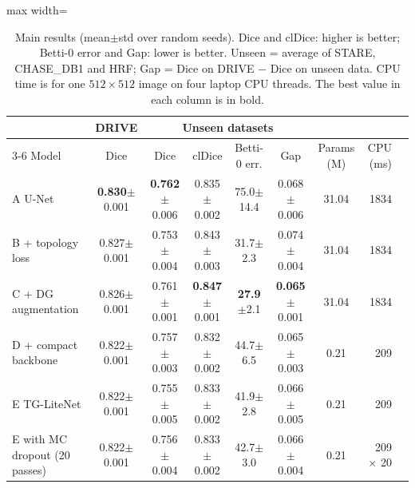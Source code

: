 \begin{table}[t]
\centering
\caption{Main results (mean$\pm$std over random seeds). Dice and clDice: higher is better; Betti-0 error and Gap: lower is better. Unseen = average of STARE, CHASE\_DB1 and HRF; Gap = Dice on DRIVE $-$ Dice on unseen data. CPU time is for one $512{\times}512$ image on four laptop CPU threads. The best value in each column is in bold.}
\label{tab:main}
\small
\begin{adjustbox}{max width=\textwidth}\begin{tabular}{l c cccc c rr}
\toprule
 & DRIVE & \multicolumn{4}{c}{Unseen datasets} & & & \\
\cmidrule(lr){3-6}
Model & Dice & Dice & clDice & Betti-0 err. & Gap & Params (M) & CPU (ms) \\
\midrule
A  U-Net & \textbf{0.830}{\scriptsize$\pm$0.001} & \textbf{0.762}{\scriptsize$\pm$0.006} & 0.835{\scriptsize$\pm$0.002} & 75.0{\scriptsize$\pm$14.4} & 0.068{\scriptsize$\pm$0.006} & 31.04 & 1834 \\
B  + topology loss & 0.827{\scriptsize$\pm$0.001} & 0.753{\scriptsize$\pm$0.004} & 0.843{\scriptsize$\pm$0.003} & 31.7{\scriptsize$\pm$2.3} & 0.074{\scriptsize$\pm$0.004} & 31.04 & 1834 \\
C  + DG augmentation & 0.826{\scriptsize$\pm$0.001} & 0.761{\scriptsize$\pm$0.001} & \textbf{0.847}{\scriptsize$\pm$0.001} & \textbf{27.9}{\scriptsize$\pm$2.1} & \textbf{0.065}{\scriptsize$\pm$0.001} & 31.04 & 1834 \\
D  + compact backbone & 0.822{\scriptsize$\pm$0.001} & 0.757{\scriptsize$\pm$0.003} & 0.832{\scriptsize$\pm$0.002} & 44.7{\scriptsize$\pm$6.5} & 0.065{\scriptsize$\pm$0.003} & 0.21 & 209 \\
E  TG-LiteNet & 0.822{\scriptsize$\pm$0.001} & 0.755{\scriptsize$\pm$0.005} & 0.833{\scriptsize$\pm$0.002} & 41.9{\scriptsize$\pm$2.8} & 0.066{\scriptsize$\pm$0.005} & 0.21 & 209 \\
E  with MC dropout (20 passes) & 0.822{\scriptsize$\pm$0.001} & 0.756{\scriptsize$\pm$0.004} & 0.833{\scriptsize$\pm$0.002} & 42.7{\scriptsize$\pm$3.0} & 0.066{\scriptsize$\pm$0.004} & 0.21 & 209 $\times$ 20 \\
\bottomrule
\end{tabular}\end{adjustbox}
\end{table}